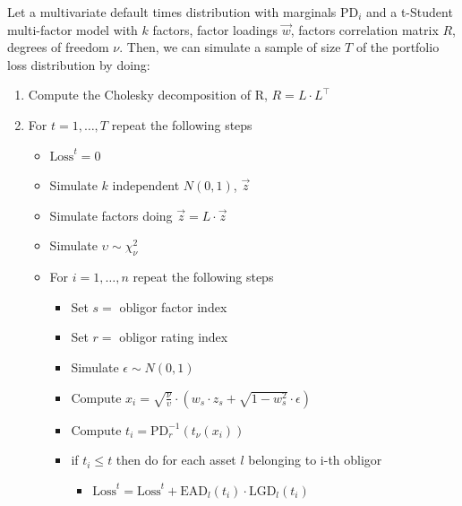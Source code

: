 \documentclass[11pt,fleqn]{book} %
\begin{document}
\begin{algorithm}
	\label{alg:pldmc}
	Let a multivariate default times distribution with marginals $\text{PD}_i$
	and a t-Student multi-factor model with $k$ factors, factor loadings $\vec{w}$, 
	factors correlation matrix $R$, degrees of freedom $\nu$. Then, we can 
	simulate a sample of size $T$ of the portfolio loss distribution by doing:
	\begin{enumerate}
		\item Compute the Cholesky decomposition of R, $R = L \cdot L^\intercal$
		\item For $t=1,\dots,T$ repeat the following steps
		\begin{itemize}
			\item $\text{Loss}^t = 0$
			\item Simulate $k$ independent $N(0,1)$, $\vec{z}$
			\item Simulate factors doing $\vec{z} = L \cdot \vec{z}$
			\item Simulate $\upsilon \sim \chi_{\nu}^2$
			\item For $i=1,\dots,n$ repeat the following steps
			\begin{itemize}
				\item Set $s = $ obligor factor index
				\item Set $r = $ obligor rating index
				\item Simulate $\epsilon \sim N(0,1)$
				\item Compute $x_i = \sqrt{\frac{\nu}{\upsilon}} \cdot \left( w_s \cdot z_s + \sqrt{1-w_s^2} \cdot \epsilon \right)$
				\item Compute $t_i = \text{PD}_r^{-1}\left(t_{\nu}(x_i)\right)$
				\item if $t_i \le t$ then do for each asset $l$ belonging to i-th obligor
				\begin{itemize}
					\item $\text{Loss}^t = \text{Loss}^t + \text{EAD}_l(t_i) \cdot \text{LGD}_l(t_i)$
				\end{itemize}
			\end{itemize}
		\end{itemize}
	\end{enumerate}
\end{algorithm}
\end{document}
